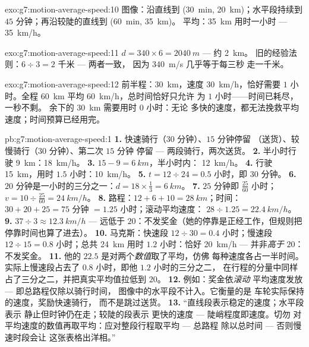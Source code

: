 \begin{solution}{exo:g7:motion-average-speed:10}
图像：沿直线到 (\qty{30}{min}, \qty{20}{km})；水平段持续到
$45$ 分钟；再沿较陡的直线到 (\qty{60}{min}, \qty{35}{km})。
平均：\qty{35}{km} 用时一小时 --- \qty{35}{km/h}。
\end{solution}

\begin{solution}{exo:g7:motion-average-speed:11}
$d = 340 \times 6 = \qty{2040}{m}$ --- 约 \qty{2}{km}。
旧的经验法则：$6 \div 3 = 2$ 千米 --- 两者一致，
因为 \qty{340}{m/s} 几乎等于每三秒
走一千米。
\end{solution}

\begin{solution}{exo:g7:motion-average-speed:12}
前半程：\qty{30}{km}，速度 \qty{30}{km/h}，恰好需要 $1$
小时。全程 \qty{60}{km} 平均 \qty{60}{km/h}，总时间恰好只允许
为 $1$ 小时——时间已耗尽，一秒不剩。
余下的 \qty{30}{km} 需要用时 $0$ 小时：无论
多快的速度，都无法挽救平均速度；时间预算已经用完。
\end{solution}

\begin{solution}{pb:g7:motion-average-speed:1}
\textbf{1.} 快速骑行（$30$ 分钟）、$15$ 分钟停留
（送货）、较慢骑行（$30$ 分钟）、第二次 $15$ 分钟
停留 --- 两段骑行，两次送货。
\textbf{2.} 半小时行驶 \qty{9}{km}：\qty{18}{km/h}。
\textbf{3.} $15 - 9 = \qty{6}{km}$，半小时内：
\qty{12}{km/h}。
\textbf{4.} 行驶 \qty{15}{km}，用时 $1.5$ 小时：\qty{10}{km/h}。
\textbf{5.} $t = 12 \div 24 = 0.5$ 小时，即 $30$ 分钟。
\textbf{6.} $20$ 分钟是一小时的三分之一：$d = 18 \times
\tfrac{1}{3} = \qty{6}{km}$。
\textbf{7.} $25$ 分钟即 $\tfrac{25}{60}$ 小时；$v = 10
\div \tfrac{25}{60} = \qty{24}{km/h}$。
\textbf{8.} 路程：$12 + 6 + 10 = \qty{28}{km}$；时间：
$30 + 20 + 25 = 75$ 分钟 $= 1.25$ 小时；滚动平均速度：
$28 \div 1.25 = \qty{22.4}{km/h}$。
\textbf{9.} $37 \div 3 \approx \qty{12.3}{km/h}$ --- 远低于
$20$：不发奖金（她的停靠是正经工作，但规则把
停靠时间也算了进去）。
\textbf{10.} 马克斯：快速段 $12 \div 30 = 0.4$ 小时；慢速段
$12 \div 15 = 0.8$ 小时；总共 \qty{24}{km} 用时 $1.2$ 小时：恰好
\qty{20}{km/h} --- 并非\emph{高于} $20$：不发奖金。
\textbf{11.} 他的 $22.5$ 是对两个\emph{数值}取了平均，仿佛
每种速度各占一半时间。实际上慢速段占去了
$0.8$ 小时，即他 $1.2$ 小时的三分之二，
在行程的分量中同样占了三分之二，并把真实平均值拉低到 $20$。
\textbf{12.} 例如：奖金依\emph{滚动}
平均速度发放 --- 即总路程仅除以骑行时间，
图像中的水平段不计入。它衡量的是
车轮实际保持的速度，奖励快速骑行，
而不是跳过送货。
\textbf{13.} “直线段表示稳定的速度；水平段表示
静止但时钟仍在走；较陡的段表示
更快的速度 --- 陡峭程度即速度。切勿
对平均速度的数值再取平均：应对整段行程取平均 --- 总路程
除以总时间 --- 否则慢速时段会让
这张表格出洋相。”
\end{solution}

